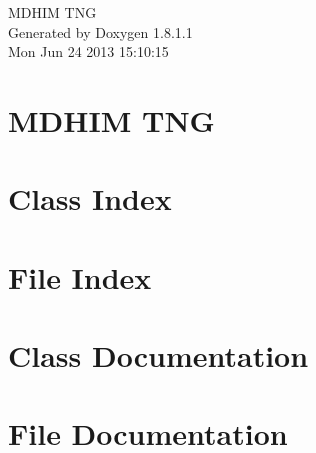 \documentclass{book}
\begin{document}
\hypersetup{pageanchor=false,citecolor=blue}
\begin{titlepage}
\vspace*{7cm}
\begin{center}
{\Large M\-D\-H\-I\-M T\-N\-G }\\
\vspace*{1cm}
{\large Generated by Doxygen 1.8.1.1}\\
\vspace*{0.5cm}
{\small Mon Jun 24 2013 15:10:15}\\
\end{center}
\end{titlepage}
\clearemptydoublepage
{}
\tableofcontents
\clearemptydoublepage
{}
\hypersetup{pageanchor=true,citecolor=blue}
\chapter{M\-D\-H\-I\-M T\-N\-G}
\label{index}\hypertarget{index}{}
\chapter{Class Index}

\chapter{File Index}

\chapter{Class Documentation}























\chapter{File Documentation}
















\printindex
\end{document}

